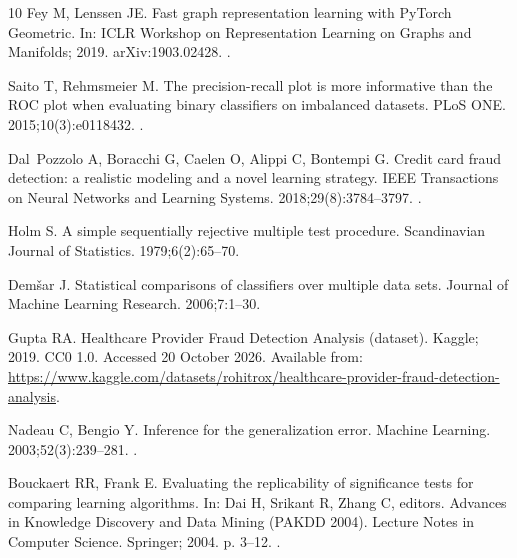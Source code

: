 \documentclass[pdflatex,sn-vancouver-num]{sn-jnl}
\begin{document}
\begin{thebibliography}{10}
Fey M, Lenssen JE.
\newblock Fast graph representation learning with {PyTorch Geometric}.
\newblock In: ICLR Workshop on Representation Learning on Graphs and Manifolds;
  2019. {arXiv}:1903.02428.
\newblock {}.

Saito T, Rehmsmeier M.
\newblock The precision-recall plot is more informative than the {ROC} plot
  when evaluating binary classifiers on imbalanced datasets.
\newblock PLoS ONE. 2015;10(3):e0118432.
\newblock {}.

Dal~Pozzolo A, Boracchi G, Caelen O, Alippi C, Bontempi G.
\newblock Credit card fraud detection: a realistic modeling and a novel
  learning strategy.
\newblock IEEE Transactions on Neural Networks and Learning Systems.
  2018;29(8):3784--3797.
\newblock {}.

Holm S.
\newblock A simple sequentially rejective multiple test procedure.
\newblock Scandinavian Journal of Statistics. 1979;6(2):65--70.

Dem{\v{s}}ar J.
\newblock Statistical comparisons of classifiers over multiple data sets.
\newblock Journal of Machine Learning Research. 2006;7:1--30.

Gupta RA. Healthcare Provider Fraud Detection Analysis (dataset).
\newblock Kaggle; 2019. CC0 1.0. Accessed 20 October 2026.
\newblock Available from:
  \url{https://www.kaggle.com/datasets/rohitrox/healthcare-provider-fraud-detection-analysis}.

Nadeau C, Bengio Y.
\newblock Inference for the generalization error.
\newblock Machine Learning. 2003;52(3):239--281.
\newblock {}.

Bouckaert RR, Frank E.
\newblock Evaluating the replicability of significance tests for comparing
  learning algorithms.
\newblock In: Dai H, Srikant R, Zhang C, editors. Advances in Knowledge
  Discovery and Data Mining (PAKDD 2004). Lecture Notes in Computer Science.
  Springer; 2004. p. 3--12.
\newblock {}.


\end{thebibliography}
\end{document}
